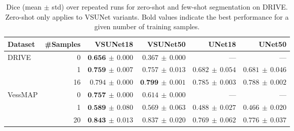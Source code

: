 \begin{table*}[t]
    \caption{Dice (mean $\pm$ std) over repeated runs for zero-shot and few-shot segmentation on DRIVE. Zero-shot only applies to VSUNet variants. Bold values indicate the best performance for a given number of training samples.}
    \label{tab:combined_fewshot_dice_models}
    \centering
    \begingroup
    \small
    \setlength{\tabcolsep}{6pt}
    \renewcommand{\arraystretch}{1.15}
    \begin{tabular}{l r r r r r}
        \hline
        \textbf{Dataset} & \textbf{\#Samples} & \textbf{VSUNet18} & \textbf{VSUNet50} & \textbf{UNet18} & \textbf{UNet50} \\
        \hline
        \multirow{3}{*}{DRIVE}
            & 0  & $\textbf{0.656} \,\pm\, 0.000$ & $0.367 \,\pm\, 0.000$ & --- & --- \\
            & 1  & $\textbf{0.759} \,\pm\, 0.007$ & $0.757 \,\pm\, 0.013$ & $0.682 \,\pm\, 0.054$ & $0.681 \,\pm\, 0.046$ \\
            & 16 & $0.794 \,\pm\, 0.000$ & $\textbf{0.799} \,\pm\, 0.001$ & $0.785 \,\pm\, 0.003$ & $0.788 \,\pm\, 0.002$ \\
        \hline
        \multirow{3}{*}{VessMAP}
            & 0  & $\textbf{0.757} \,\pm\, 0.000$ & $0.614 \,\pm\, 0.000$ & --- & --- \\
            & 1  & $\textbf{0.589} \,\pm\, 0.080$ & $0.569 \,\pm\, 0.063$ & $0.488 \,\pm\, 0.027$ & $0.466 \,\pm\, 0.020$ \\
            & 20 & $\textbf{0.843} \,\pm\, 0.013$ & $0.837 \,\pm\, 0.020$ & $0.769 \,\pm\, 0.062$ & $0.776 \,\pm\, 0.037$ \\
        \hline
    \end{tabular}
    \endgroup 
\end{table*}